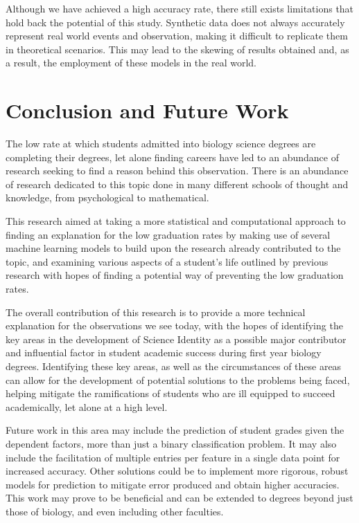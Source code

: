 \documentclass[conference]{IEEEtran}
\begin{document}
Although we have achieved a high accuracy rate, there still exists limitations that hold back the potential of this study. Synthetic data does not always accurately represent real world events and observation, making it difficult to replicate them in theoretical scenarios. This may lead to the skewing of results obtained and, as a result, the employment of these models in the real world.

\section{Conclusion and Future Work}
The low rate at which students admitted into biology science degrees are completing their degrees, let alone finding careers have led to an abundance of research seeking to find a reason behind this observation. There is an abundance of research dedicated to this topic done in many different schools of thought and knowledge, from psychological to mathematical.

This research aimed at taking a more statistical and computational approach to finding an explanation for the low graduation rates by making use of several machine learning models to build upon the research already contributed to the topic, and examining various aspects of a student's life outlined by previous research with hopes of finding a potential way of preventing the low graduation rates.

The overall contribution of this research is to provide a more technical explanation for the observations we see today, with the hopes of identifying the key areas in the development of Science Identity as a possible major contributor and influential factor in student academic success during first year biology degrees. Identifying these key areas, as well as the circumstances of these areas can allow for the development of potential solutions to the problems being faced, helping mitigate the ramifications of students who are ill equipped to succeed academically, let alone at a high level.

Future work in this area may include the prediction of student grades given the dependent factors, more than just a binary classification problem. It may also include the facilitation of multiple entries per feature in a single data point for increased accuracy. Other solutions could be to implement more rigorous, robust models for prediction to mitigate error produced and obtain higher accuracies. This work may prove to be beneficial and can be extended to degrees beyond just those of biology, and even including other faculties.
\end{document}
